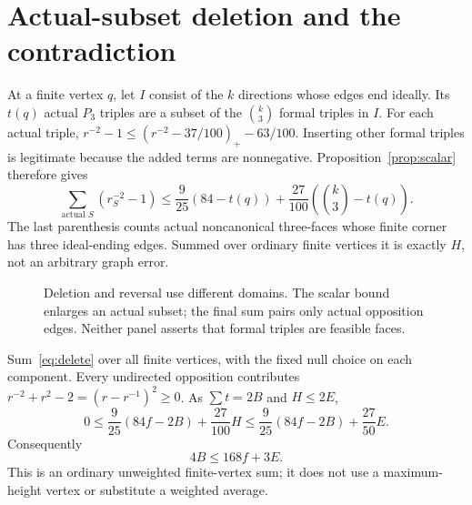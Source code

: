\documentclass[11pt]{article}
\newcommand{\Pthree}{P_3}
\begin{document}
\section{Actual-subset deletion and the contradiction}
At a finite vertex $q$, let $I$ consist of the $k$ directions whose
edges end ideally. Its $t(q)$ actual $\Pthree$ triples are a subset of
the $\binom k3$ formal triples in $I$. For each actual triple,
$r^{-2}-1\le(r^{-2}-37/100)_+-63/100$.
Inserting other formal triples is legitimate because the added terms
are nonnegative. Proposition~\ref{prop:scalar} therefore gives
\begin{equation}\label{eq:delete}
 \sum_{\text{actual }S}(r_S^{-2}-1)
 \le\frac9{25}(84-t(q))
       +\frac{27}{100}\left(\binom k3-t(q)\right).
\end{equation}
The last parenthesis counts actual noncanonical three-faces whose
finite corner has three ideal-ending edges. Summed over ordinary
finite vertices it is exactly $H$, not an arbitrary graph error.

\begin{figure}[ht]
\centering
{}
\caption{Deletion and reversal use different domains. The scalar bound
enlarges an actual subset; the final sum pairs only actual opposition
edges. Neither panel asserts that formal triples are feasible faces.}
\label{fig:pairing}
\end{figure}

Sum~\eqref{eq:delete} over all finite vertices, with the fixed null
choice on each component. Every undirected opposition contributes
$r^{-2}+r^2-2=(r-r^{-1})^2\ge0$. As $\sum t=2B$ and $H\le2E$,
\[
 0\le\frac9{25}(84f-2B)+\frac{27}{100}H
 \le\frac9{25}(84f-2B)+\frac{27}{50}E.
\]
Consequently
\begin{equation}\label{eq:upper}
 \boxed{4B\le168f+3E.}
\end{equation}
This is an ordinary unweighted finite-vertex sum; it does not use a
maximum-height vertex or substitute a weighted average.
\end{document}
